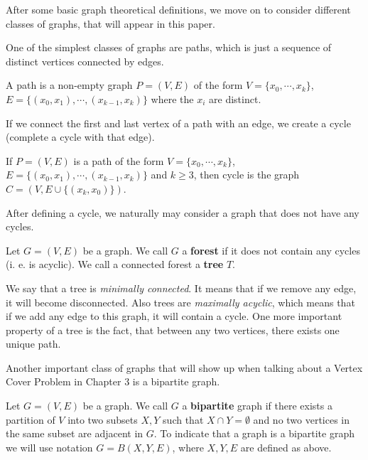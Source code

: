 After some basic graph theoretical definitions, we move on to consider different 
classes of graphs, that will appear in this paper.

One of the simplest classes of graphs are paths, which is just a sequence of 
distinct vertices connected by edges.

\begin{defn}
\label{defn:path}
    A path is a non-empty graph $P = (V, E)$ of the form $V = \{x_0, \cdots, x_k\}$,
    $E = \{(x_0, x_1), \cdots, (x_{k-1}, x_k)\}$ where the $x_i$ are distinct.
\end{defn}

If we connect the first and last vertex of a path with an edge, we create a cycle 
(complete a cycle with that edge).

\begin{defn}
\label{defn:cycle}
    If $P = (V, E)$ is a path of the form $V = \{x_0, \cdots, x_k\}$,
    $E = \{(x_0, x_1), \cdots, (x_{k-1}, x_k)\}$ and $k \geq 3$, then cycle is the 
    graph $C = (V, E \cup \{(x_k, x_0)\})$.
\end{defn}

After defining a cycle, we naturally may consider a graph that does not have any cycles.

\begin{defn}
\label{defn:tree}
Let $G = (V, E)$ be a graph. We call $G$ a \textbf{forest} if it does not contain any cycles (i. e. is acyclic).
We call a connected forest a \textbf{tree} $T$.
\end{defn}

We say that a tree is \textit{minimally connected}. It means that if we remove any edge, 
it will become disconnected. Also trees are \textit{maximally acyclic}, which means 
that if we add any edge to this graph, it will contain a cycle. One more important 
property of a tree is the fact, that between any two vertices, there exists one unique 
path.

Another important class of graphs that will show up when talking about a 
Vertex Cover Problem in Chapter 3 is a bipartite graph.

\begin{defn}
\label{defn:bipartite}
Let $G = (V, E)$ be a graph. We call $G$ a \textbf{bipartite} graph if there exists a partition of $V$ into two subsets $X, Y$ such that
    $X \cap Y = \emptyset$ and no two vertices in the same subset are adjacent in $G$.
    To indicate that a graph is a bipartite graph we will use notation $G = B(X, Y, E)$,
    where $X, Y, E$ are defined as above.
\end{defn}



